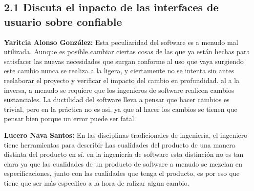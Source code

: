 
\subsection*{2.1 Discuta el inpacto de las interfaces de usuario sobre confiable}

\textbf{Yaritcia Alonso González:}
 Esta peculiaridad del software es a menudo mal utilizada. Aunque es posible cambiar ciertas cosas de las que
ya están hechas para satisfacer las nuevas necesidades que surgan conforme al uso que vaya surgiendo
 este cambio nunca se realiza a la ligera, y ciertamente no se intenta sin antes
reelaborar el proyecto y verificar el impacto del cambio en profundidad. al
a la inversa, a menudo se requiere que los ingenieros de software realicen cambios sustanciales.
La ductilidad del software lleva a pensar que hacer cambios es trivial, pero en la práctica
no es asi, ya que al hacer los cambios  se tienen que pensar bien porque un error puede ser fatal.

\textbf{Lucero Nava Santos:}
En las disciplinas tradicionales de ingeniería, el ingeniero tiene herramientas para describir
Las cualidades del producto de una manera distinta del producto en sí. en la ingeniería
de software esta distinción no es tan clara ya que las cualidades de un producto de software
a menudo se mezclan en especificaciones, junto con las cualidades que tenga el producto, es por eso
que tiene que ser más específico a la hora de ralizar algun cambio.
\begin{quote}

\end{quote}


